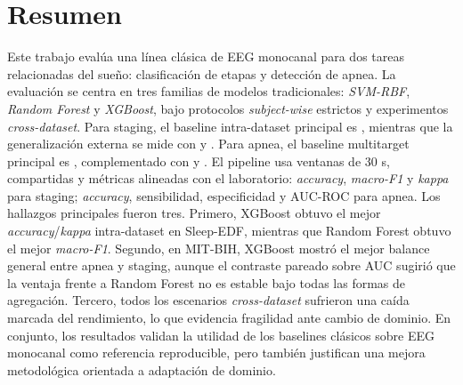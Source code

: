 \section*{Resumen}
Este trabajo eval\'ua una l\'inea cl\'asica de EEG monocanal para dos tareas relacionadas del sue\~no: clasificaci\'on de etapas y detecci\'on de apnea. La evaluaci\'on se centra en tres familias de modelos tradicionales: \emph{SVM-RBF}, \emph{Random Forest} y \emph{XGBoost}, bajo protocolos \emph{subject-wise} estrictos y experimentos \emph{cross-dataset}. Para staging, el baseline intra-dataset principal es , mientras que la generalizaci\'on externa se mide con  y . Para apnea, el baseline multitarget principal es , complementado con  y . El pipeline usa ventanas de 30 s,  compartidas y m\'etricas alineadas con el laboratorio: \emph{accuracy}, \emph{macro-F1} y \emph{kappa} para staging; \emph{accuracy}, sensibilidad, especificidad y AUC-ROC para apnea. Los hallazgos principales fueron tres. Primero, XGBoost obtuvo el mejor \emph{accuracy}/\emph{kappa} intra-dataset en Sleep-EDF, mientras que Random Forest obtuvo el mejor \emph{macro-F1}. Segundo, en MIT-BIH, XGBoost mostr\'o el mejor balance general entre apnea y staging, aunque el contraste pareado sobre AUC sugiri\'o que la ventaja frente a Random Forest no es estable bajo todas las formas de agregaci\'on. Tercero, todos los escenarios \emph{cross-dataset} sufrieron una ca\'ida marcada del rendimiento, lo que evidencia fragilidad ante cambio de dominio. En conjunto, los resultados validan la utilidad de los baselines cl\'asicos sobre EEG monocanal como referencia reproducible, pero tambi\'en justifican una mejora metodol\'ogica orientada a adaptaci\'on de dominio.
